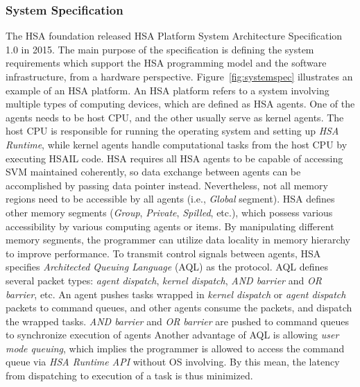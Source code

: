         \subsubsection{System Specification}
        The HSA foundation released HSA Platform System Architecture Specification 1.0 \cite{systemspec} in 2015.
        The main purpose of the specification is defining the system requirements which support the HSA programming model and the software infrastructure, from a hardware perspective.
        Figure~\ref{fig:systemspec} illustrates an example of an HSA platform.
        An HSA platform refers to a system involving multiple types of computing devices, 
        which are defined as HSA agents.
        One of the agents needs to be host CPU, and the other usually serve as kernel agents. 
        The host CPU is responsible for running the operating system and setting up \textit{HSA Runtime},
        while kernel agents handle computational tasks from the host CPU by executing HSAIL code.
        HSA requires all HSA agents to be capable of accessing SVM maintained coherently, 
        so data exchange between agents can be accomplished by passing data pointer instead.
        Nevertheless, not all memory regions need to be accessible by all agents (i.e., \textit{Global} segment).
        HSA defines other memory segments (\textit{Group}, \textit{Private}, \textit{Spilled}, etc.), 
        which possess various accessibility by various computing agents or items.
        By manipulating different memory segments, the programmer can utilize data locality in memory hierarchy to improve performance.
        To transmit control signals between agents, HSA specifies \textit{Architected Queuing Language} (AQL) as the protocol. 
        AQL defines several packet types: \textit{agent dispatch}, \textit{kernel dispatch}, \textit{AND barrier} and \textit{OR barrier}, etc.
        An agent pushes tasks wrapped in \textit{kernel dispatch} or \textit{agent dispatch} packets to command queues, 
        and other agents consume the packets, and dispatch the wrapped tasks.
        \textit{AND barrier} and \textit{OR barrier} are pushed to command queues to synchronize execution of agents 
        Another advantage of AQL is allowing \textit{user mode queuing},
        which implies the programmer is allowed to access the command queue via \textit{HSA Runtime API} without OS involving.
        By this mean, the latency from dispatching to execution of a task is thus minimized.
        \vspace{\textfig}
